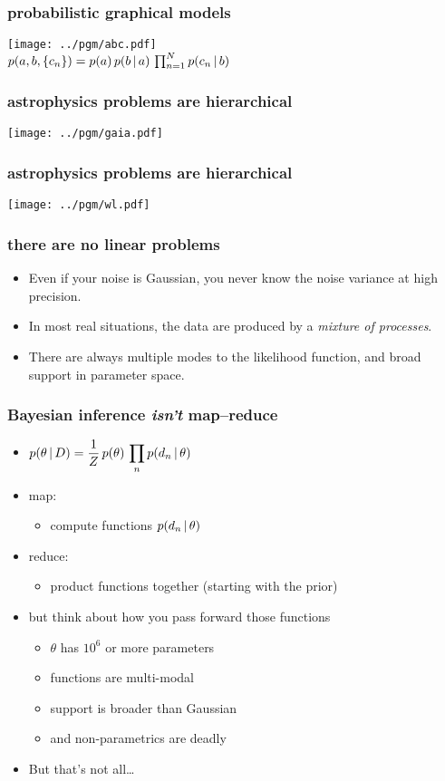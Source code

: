 \documentclass[pdftex]{beamer}
\begin{document}
\begin{frame}
  \frametitle{probabilistic graphical models}
  \texttt{[image: ../pgm/abc.pdf]}\\
  $p(a, b, \{c_n\}) = p(a)\,p(b\,|\, a)\,\prod_{n=1}^N p(c_n\,|\, b)$
\end{frame}

\begin{frame}
  \frametitle{astrophysics problems are hierarchical}
  \texttt{[image: ../pgm/gaia.pdf]}
\end{frame}

\begin{frame}
  \frametitle{astrophysics problems are hierarchical}
  \texttt{[image: ../pgm/wl.pdf]}
\end{frame}

\begin{frame}
  \frametitle{there are no linear problems}
  \begin{itemize}
  \item Even if your noise is Gaussian, you never know the noise
    variance at high precision.
  \item In most real situations, the data are produced by a
    \emph{mixture of processes}.
  \item There are always multiple modes to the likelihood function,
    and broad support in parameter space.
  \end{itemize}
\end{frame}

\begin{frame}
  \frametitle{Bayesian inference \emph{isn't} map--reduce}
  \begin{itemize}
  \item $\displaystyle p(\theta\,|\, D) = \frac{1}{Z}\,p(\theta)\,\prod_n p(d_n\,|\,\theta)$
  \item map:
    \begin{itemize}
    \item compute functions $p(d_n\,|\,\theta)$
    \end{itemize}
  \item reduce:
    \begin{itemize}
    \item product functions together (starting with the prior)
    \end{itemize}
  \item but think about how you pass forward those functions
    \begin{itemize}
    \item $\theta$ has $10^6$ or more parameters
    \item functions are multi-modal
    \item support is broader than Gaussian
    \item and non-parametrics are deadly
    \end{itemize}
  \item But that's not all\ldots
  \end{itemize}
\end{frame}
\end{document}
